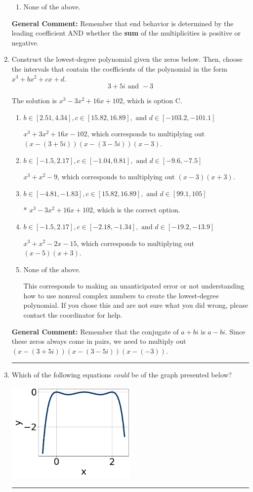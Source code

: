 \documentclass{extbook}[14pt]
\newcommand{\litem}[1]{\item #1

\rule{\textwidth}{0.4pt}}
\begin{document}
\begin{enumerate}
{\begin{enumerate}[label=\Alph*.]
\begin{multicols}{2}
\end{multicols}\item None of the above.\end{enumerate}
\textbf{General Comment:} Remember that end behavior is determined by the leading coefficient AND whether the \textbf{sum} of the multiplicities is positive or negative.
}
\litem{
Construct the lowest-degree polynomial given the zeros below. Then, choose the intervals that contain the coefficients of the polynomial in the form $x^3+bx^2+cx+d$.
\[ 3 + 5 i \text{ and } -3 \]

The solution is \( x^{3} -3 x^{2} +16 x + 102 \), which is option C.\begin{enumerate}[label=\Alph*.]
\item \( b \in [2.51, 4.34], c \in [15.82, 16.89], \text{ and } d \in [-103.2, -101.1] \)

$x^{3} +3 x^{2} +16 x -102$, which corresponds to multiplying out $(x-(3 + 5 i))(x-(3 - 5 i))(x -3)$.
\item \( b \in [-1.5, 2.17], c \in [-1.04, 0.81], \text{ and } d \in [-9.6, -7.5] \)

$x^{3} + x^{2} -9$, which corresponds to multiplying out $(x -3)(x + 3)$.
\item \( b \in [-4.81, -1.83], c \in [15.82, 16.89], \text{ and } d \in [99.1, 105] \)

* $x^{3} -3 x^{2} +16 x + 102$, which is the correct option.
\item \( b \in [-1.5, 2.17], c \in [-2.18, -1.34], \text{ and } d \in [-19.2, -13.9] \)

$x^{3} + x^{2} -2 x -15$, which corresponds to multiplying out $(x -5)(x + 3)$.
\item \( \text{None of the above.} \)

This corresponds to making an unanticipated error or not understanding how to use nonreal complex numbers to create the lowest-degree polynomial. If you chose this and are not sure what you did wrong, please contact the coordinator for help.
\end{enumerate}

\textbf{General Comment:} Remember that the conjugate of $a+bi$ is $a-bi$. Since these zeros always come in pairs, we need to multiply out $(x-(3 + 5 i))(x-(3 - 5 i))(x-(-3))$.
}
\litem{
Which of the following equations \textit{could} be of the graph presented below?

\begin{center}
    \includegraphics[width=0.5\textwidth]{../Figures/polyGraphToFunctionCopyC.png}
\end{center}




}
\end{enumerate}
\end{document}
